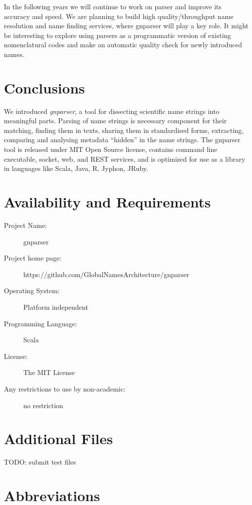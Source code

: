 \documentclass{bmcart}
\begin{document}
In the following years we will continue to work on parser and improve its
accuracy and speed. We are planning to build high quality/throughput name
resolution and name finding services, where gnparser will play a key role.
It might be interesting to explore using parsers as a programmatic version
of existing nomenclatural codes and make an automatic quality check for newly
introduced names.

\section*{Conclusions}

We introduced \textit{gnparser}, a tool for dissecting scientific name strings
into meaningful parts. Parsing of name strings is necessary component for their
matching, finding them in texts, sharing them in standardised forms,
extracting, comparing and analysing metadata ``hidden'' in the name strings.
The gnparser tool is released under MIT Open Source license, contains command
line executable, socket, web, and REST services, and is optimized for use as a
library in languages like Scala, Java, R, Jyphon, JRuby.

\section*{Availability and Requirements}

\begin{description}
  \item[Project Name:] gnparser
  \item[Project home page:] https://github.com/GlobalNamesArchitecture/gnparser
  \item[Operating System:] Platform independent
  \item[Programming Language:] Scala
  \item[License:] The MIT License
  \item[Any restrictions to use by non-academic:] no restriction
\end{description}

\section*{Additional Files}

TODO: submit test files

\section*{Abbreviations}
\end{document}
